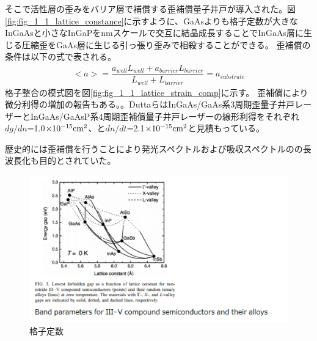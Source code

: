 そこで活性層の歪みをバリア層で補償する歪補償量子井戸が導入された。図\ref{fig:fig_1_1_lattice_constance}に示すように、GaAsよりも格子定数が大きなInGaAsと小さなInGaPをnmスケールで交互に結晶成長することで\rm{InGaAs}層に生じる圧縮歪をGaAs層に生じる引っ張り歪みで相殺することができる。
歪補償の条件は以下の式で表される。
\begin{eqnarray}
<a>=\dfrac{a_{well}L_{well}+a_{barrier}L_{barrier}}{L_{well}+L_{barrier}}=a_{substrate}
\end{eqnarray}
格子整合の模式図を図\ref{fig:fig_1_1_lattice_strain_comp}に示す。
歪補償により微分利得の増加の報告もある。\cite{ref_Dutta}。DuttaらはInGaAs/GaAs系3周期歪量子井戸レーザーとInGaAs/GaAsP系4周期歪補償量子井戸レーザーの線形利得をそれぞれ$dg/dn$=1.0$\times 10^{-15}\rm{cm^{2}}$、と$dn/dt$=2.1$\times 10^{-15}\rm{cm^{2}}$と見積もっている。

歴史的には歪補償を行うことにより発光スペクトルおよび吸収スペクトルのの長波長化も目的とされていた。

\begin{figure}[h]
	\centering
	\includegraphics[width=15cm]{figure/fig_1_1_lattice_constance.png}
	\caption{格子定数}
	\label{fig:fig_1_1_latittce_constance}
\end{figure}

